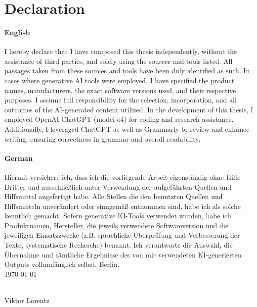 \chapter*{Declaration}
\thispagestyle{empty}
\subsubsection{English}
I hereby declare that I have composed this thesis independently, without the assistance of third parties, and solely using the sources and tools listed. All passages taken from these sources and tools have been duly identified as such.
In cases where generative AI tools were employed, I have specified the product names, manufacturers, the exact software versions used, and their respective purposes. I assume full responsibility for the selection, incorporation, and all outcomes of the AI-generated content utilized.
In the development of this thesis, I employed OpenAI ChatGPT (model o4) for coding and research assistance. Additionally, I leveraged ChatGPT as well as Grammarly to review and enhance writing, ensuring correctness in grammar and overall readability. 
\subsubsection{German}
Hiermit versichere ich, dass ich die vorliegende Arbeit eigenständig ohne Hilfe Dritter und ausschließlich unter Verwendung der aufgeführten Quellen und Hilfsmittel angefertigt habe. Alle Stellen die den benutzten Quellen und Hilfsmitteln unverändert oder sinngemäß entnommen sind, habe ich als solche kenntlich gemacht.
Sofern generative KI-Tools verwendet wurden, habe ich Produktnamen, Hersteller, die jeweils verwendete Softwareversion und die jeweiligen Einsatzzwecke (z.B. sprachliche Überprüfung und Verbesserung der Texte, systematische Recherche) benannt. Ich verantworte die Auswahl, die Übernahme und sämtliche Ergebnisse des von mir verwendeten KI-generierten Outputs vollumfänglich selbst.
\vspace{3cm}
\noindent{}Berlin, \\\today
\begin{minipage}[t]{8cm}
\centering \hspace{20mm} \hrulefill \\
\hspace{20mm}Viktor Lorentz
\end{minipage}